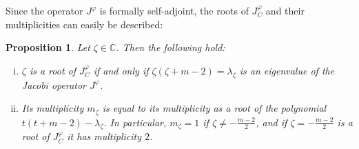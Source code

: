 \documentclass{article}
\numberwithin{equation}{section}        %
\theoremstyle{bfnote}
\newtheorem{prop}[thm]{Proposition}         %
\theoremstyle{definition}
\theoremstyle{bfremark}
\newcommand{\C}{\mathbb{C}}                 %
\begin{document}
Since the operator $J^\varphi$ is formally self-adjoint, the roots of $J^\varphi_C$ and their multiplicities can easily be described:

\begin{prop}        \label{prop: Description of the roots}
    Let $\zeta \in \C$. Then the following hold:
    \begin{enumerate}[(i)]
        \item $\zeta$ is a root of $J^\varphi_C$ if and only if $\zeta(\zeta + m - 2) = \lambda_\zeta$ is an eigenvalue of the Jacobi operator $J^\varphi$.
        \item Its multiplicity $m_\zeta$ is equal to its multiplicity as a root of the polynomial $t(t+m-2)-\lambda_\zeta$. In particular, $m_\zeta = 1$ if $\zeta \neq - \tfrac{m-2}{2}$, and if $\zeta = -\tfrac{m-2}{2}$ is a root of $J^\varphi_C$ it has multiplicity $2$.
    \end{enumerate}
\end{prop}
\end{document}
